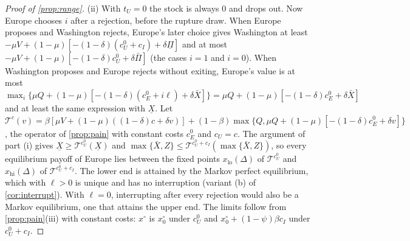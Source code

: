 \begin{proof}[Proof of \cref{prop:range}]
(ii) With $t_U=0$ the stock is always $0$ and drops out. Now Europe chooses $i$ after a rejection, before the rupture draw. When Europe proposes and Washington rejects, Europe's later choice gives Washington at least $-\mu V+(1-\mu)[-(1-\delta)(c^0_U+c_I)+\delta\underline\Pi]$ and at most $-\mu V+(1-\mu)[-(1-\delta)c^0_U+\delta\bar\Pi]$ (the cases $i=1$ and $i=0$). When Washington proposes and Europe rejects without exiting, Europe's value is at most $\max_i\{\mu Q+(1-\mu)[-(1-\delta)(c^0_E+i\ell)+\delta\bar X]\}=\mu Q+(1-\mu)[-(1-\delta)c^0_E+\delta\bar X]$ and at least the same expression with $\underline X$. Let $\mathcal T^{c}(v)=\beta[\mu V+(1-\mu)((1-\delta)c+\delta v)]+(1-\beta)\max\{Q,\mu Q+(1-\mu)[-(1-\delta)c^0_E+\delta v]\}$, the operator of \cref{prop:pain} with constant costs $c^0_E$ and $c_U=c$. The argument of part (i) gives $\underline X\ge\mathcal T^{c^0_U}(\underline X)$ and $\max\{\bar X,Z\}\le\mathcal T^{c^0_U+c_I}(\max\{\bar X,Z\})$, so every equilibrium payoff of Europe lies between the fixed points $x_{\mathrm{lo}}(\Delta)$ of $\mathcal T^{c^0_U}$ and $x_{\mathrm{hi}}(\Delta)$ of $\mathcal T^{c^0_U+c_I}$. The lower end is attained by the Markov perfect equilibrium, which with $\ell>0$ is unique and has no interruption (variant (b) of \cref{cor:interrupt}). With $\ell=0$, interrupting after every rejection would also be a Markov equilibrium, one that attains the upper end. The limits follow from \cref{prop:pain}(iii) with constant costs: $x^\circ$ is $x^\circ_0$ under $c^0_U$ and $x^\circ_0+(1-\psi)\beta c_I$ under $c^0_U+c_I$.


\end{proof}
